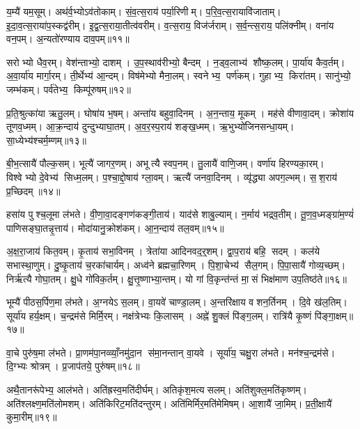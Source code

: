 य॒म्यै॑ यम॒सूम्।
अथ॑र्व॒भ्योऽव॑तोकाम्।
सं॒व॒त्स॒राय॑ पर्या॒रिणीम्।
प॒रि॒व॒त्स॒रायावि॑जाताम्।
इ॒दा॒व॒त्स॒राया॑प॒स्कद्व॑रीम्।
इ॒द्व॒त्स॒राया॒तीत्व॑वरीम्।
व॒त्स॒राय॒ विज॑र्जराम्।
स॒र्व॒न्त्स॒राय॒ पलि॑क्नीम्।
वना॑य वन॒पम्।
अ॒न्यतो॑रण्याय दाव॒पम्॥११॥

सरोभ्यो धैव॒रम्।
वेश॑न्ताभ्यो॒ दाशम्।
उ॒प॒स्थाव॑रीभ्यो॒ बैन्दम्।
न॒ड्व॒लाभ्य॑ शौष्क॒लम्।
पा॒र्या॑य कैव॒र्तम्।
अ॒वा॒र्या॑य मार्गा॒रम्।
ती॒र्थेभ्य॑ आ॒न्दम्।
विष॑मेभ्यो मैना॒लम्।
स्वनेभ्य॒ पर्ण॑कम्।
गुहाभ्य॒ किरा॑तम्।
सानु॑भ्यो॒ जम्भ॑कम्।
पर्व॑तेभ्य॒ किम्पू॑रुषम्॥१२॥

प्र॒ति॒श्रुत्का॑या ऋतु॒लम्।
घोषा॑य भ॒षम्।
अन्ता॑य बहुवा॒दिनम्।
अ॒न॒न्ताय॒ मूकम्।
मह॑से वीणावा॒दम्।
क्रोशा॑य तूणव॒ध्मम्।
आ॒क्र॒न्दाय॑ दुन्दुभ्याघा॒तम्।
अ॒व॒र॒स्प॒राय॑ शङ्ख॒ध्मम्।
ऋ॒भुभ्यो॑जिनसन्धा॒यम्।
सा॒ध्येभ्य॑श्चर्म॒म्णम्॥१३॥

बी॒भ॒त्सायै॑ पौल्क॒सम्।
भूत्यै॑ जागर॒णम्।
अभूत्यै स्वप॒नम्।
तु॒लायै॑ वाणि॒जम्।
वर्णा॑य हिरण्यका॒रम्।
विश्वेभ्यो दे॒वेभ्य॑ सिध्म॒लम्।
प॒श्चा॒द्दो॒षाय॑ ग्ला॒वम्।
ऋत्यै॑ जनवा॒दिनम्।
व्यृ॑द्ध्या अपग॒ल्भम्।
स॒श॒राय॑ प्र॒च्छिदम्॥१४॥

हसा॑य पुश्च॒लूमा ल॑भते।
वी॒णा॒वा॒दङ्गण॑कङ्गी॒ताय॑।
याद॑से शाबु॒ल्याम्।
न॒र्माय॑ भद्रव॒तीम्।
तू॒ण॒व॒ध्मङ्ग्रा॑म॒ण्यं॑ पाणिसङ्घा॒तन्नृ॒त्ताय॑।
मोदा॑यानु॒क्रोश॑कम्।
आ॒न॒न्दाय॑ तल॒वम्॥१५॥

अ॒क्ष॒रा॒जाय॑ कित॒वम्।
कृ॒ताय॑ सभा॒विनम्।
त्रेता॑या आदिनवद॒र्॒शम्।
द्वा॒प॒राय॑ बहि॒ सदम्।
कल॑ये सभास्था॒णुम्।
दु॒ष्कृ॒ताय॑ च॒रका॑चार्यम्।
अध्व॑ने ब्रह्मचा॒रिणम्।
पि॒शा॒चेभ्य॑ सैल॒गम्।
पि॒पा॒सायै॑ गोव्य॒च्छम्।
निर्\mbox{}ऋ॑त्यै गोघा॒तम्।
क्षु॒धे गो॑विक॒र्तम्।
क्षु॒त्तृ॒ष्णाभ्या॒न्तम्।
यो गां वि॒कृन्त॑न्तं मा॒सं भिक्ष॑माण उप॒तिष्ठ॑ते॥१६॥

भूम्यै॑ पीठस॒र्पिण॒मा ल॑भते।
अ॒ग्नयेऽस॒लम्।
वा॒यवे॑ चाण्डा॒लम्।
अ॒न्तरि॑क्षाय वशन॒र्तिनम्।
दि॒वे ख॑ल॒तिम्।
सूर्या॑य हर्य॒क्षम्।
च॒न्द्रम॑से मिर्मि॒रम्।
नक्ष॑त्रेभ्यः कि॒लासम्।
अह्ने॑ शु॒क्लं पि॑ङ्ग॒लम्।
रात्रि॑यै कृ॒ष्णं पि॑ङ्गा॒क्षम्॥१७॥

वा॒चे पुरु॑ष॒मा ल॑भते।
प्रा॒णम॑पा॒नव्व्याँ॒नमु॑दा॒न स॑मा॒नन्तान् वा॒यवे।
सूर्या॑य॒ चक्षु॒रा ल॑भते।
मन॑श्च॒न्द्रम॑से।
दि॒ग्भ्यः श्रोत्रम्।
प्र॒जाप॑तये॒ पुरु॑षम्॥१८॥

अथै॒तानरू॑पेभ्य॒ आल॑भते।
अति॑ह्रस्व॒मति॑दीर्घम्।
अतिकृ॑श॒मत्यसलम्।
अति॑शुक्ल॒मति॑कृष्णम्।
अति॑श्लक्ष्ण॒मति॑लोमशम्।
अति॑किरिट॒मति॑दन्तुरम्।
अति॑मिर्मिर॒मति॑मेमिषम्।
आ॒शायै॑ जा॒मिम्।
प्र॒ती॒क्षायै॑ कुमा॒रीम्॥१९॥%




